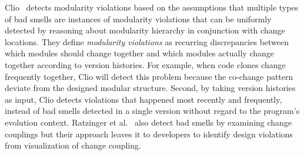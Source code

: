 Clio~\cite{Wong2011:cleo} detects modularity violations based on the assumptions that multiple types of bad smells are instances of modularity violations that can be uniformly detected by reasoning about modularity hierarchy in conjunction with change locations.  They define {\em modularity violations} as recurring discrepancies between which modules should change together and which modules actually change together according to version histories. For example, when code clones change frequently together, Clio will detect this problem because the co-change pattern deviate from the designed modular structure. Second, by taking version histories as input, Clio detects violations that happened most recently and frequently, instead of bad smells detected in a single version without regard to the program's evolution context. Ratzinger et al.~\cite{ratzinger:msr05} also detect bad smells by examining change couplings but their approach leaves it to developers to identify design violations from visualization of change coupling. 


